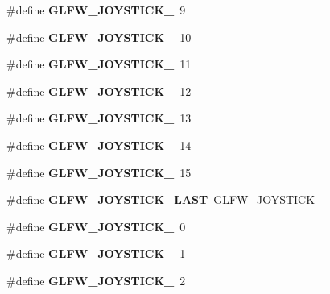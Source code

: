 \begin{DoxyCompactItemize}
\#define {\bfseries G\+L\+F\+W\+\_\+\+J\+O\+Y\+S\+T\+I\+C\+K\+\_}~9
\item 
\mbox{\label{group__joysticks_gae7d26e3df447c2c14a569fcc18516af4}} 
\#define {\bfseries G\+L\+F\+W\+\_\+\+J\+O\+Y\+S\+T\+I\+C\+K\+\_}~10
\item 
\mbox{\label{group__joysticks_gab91bbf5b7ca6be8d3ac5c4d89ff48ac7}} 
\#define {\bfseries G\+L\+F\+W\+\_\+\+J\+O\+Y\+S\+T\+I\+C\+K\+\_}~11
\item 
\mbox{\label{group__joysticks_ga5c84fb4e49bf661d7d7c78eb4018c508}} 
\#define {\bfseries G\+L\+F\+W\+\_\+\+J\+O\+Y\+S\+T\+I\+C\+K\+\_}~12
\item 
\mbox{\label{group__joysticks_ga89540873278ae5a42b3e70d64164dc74}} 
\#define {\bfseries G\+L\+F\+W\+\_\+\+J\+O\+Y\+S\+T\+I\+C\+K\+\_}~13
\item 
\mbox{\label{group__joysticks_ga7b02ab70daf7a78bcc942d5d4cc1dcf9}} 
\#define {\bfseries G\+L\+F\+W\+\_\+\+J\+O\+Y\+S\+T\+I\+C\+K\+\_}~14
\item 
\mbox{\label{group__joysticks_ga453edeeabf350827646b6857df4f80ce}} 
\#define {\bfseries G\+L\+F\+W\+\_\+\+J\+O\+Y\+S\+T\+I\+C\+K\+\_}~15
\item 
\mbox{\label{group__joysticks_ga9ca13ebf24c331dd98df17d84a4b72c9}} 
\#define {\bfseries G\+L\+F\+W\+\_\+\+J\+O\+Y\+S\+T\+I\+C\+K\+\_\+\+L\+A\+ST}~G\+L\+F\+W\+\_\+\+J\+O\+Y\+S\+T\+I\+C\+K\+\_
\item 
\mbox{\label{group__joysticks_ga34a0443d059e9f22272cd4669073f73d}} 
\#define {\bfseries G\+L\+F\+W\+\_\+\+J\+O\+Y\+S\+T\+I\+C\+K\+\_}~0
\item 
\mbox{\label{group__joysticks_ga6eab65ec88e65e0850ef8413504cb50c}} 
\#define {\bfseries G\+L\+F\+W\+\_\+\+J\+O\+Y\+S\+T\+I\+C\+K\+\_}~1
\item 
\mbox{\label{group__joysticks_gae6f3eedfeb42424c2f5e3161efb0b654}} 
\#define {\bfseries G\+L\+F\+W\+\_\+\+J\+O\+Y\+S\+T\+I\+C\+K\+\_}~2

\end{DoxyCompactItemize}
